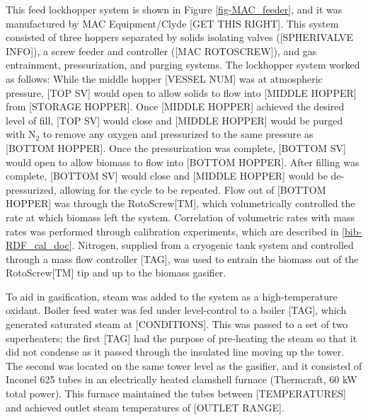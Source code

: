 \documentclass[11pt,twocolumn]{article}
\begin{document}
This feed lockhopper system is shown in Figure \ref{fig-MAC_feeder}, and it was manufactured by MAC Equipment/Clyde [GET THIS RIGHT].  This system consisted of three hoppers separated by solids isolating valves ([SPHERIVALVE INFO]), a screw feeder and controller ([MAC ROTOSCREW]), and gas entrainment, pressurization, and purging systems.  The lockhopper system worked as follows:  While the middle hopper [VESSEL NUM] was at atmospheric pressure, [TOP SV] would open to allow solids to flow into [MIDDLE HOPPER] from [STORAGE HOPPER].  Once [MIDDLE HOPPER] achieved the desired level of fill, [TOP SV] would close and [MIDDLE HOPPER] would be purged with N$_2$ to remove any oxygen and pressurized to the same pressure as [BOTTOM HOPPER].  Once the pressurization was complete, [BOTTOM SV] would open to allow biomass to flow into [BOTTOM HOPPER].  After filling was complete, [BOTTOM SV] would close and [MIDDLE HOPPER] would be de-pressurized, allowing for the cycle to be repeated.  Flow out of [BOTTOM HOPPER] was through the RotoScrew[TM], which volumetrically controlled the rate at which biomass left the system.  Correlation of volumetric rates with mass rates was performed through calibration experiments, which are described in \ref{bib-RDF_cal_doc}.  Nitrogen, supplied from a cryogenic tank system and controlled through a mass flow controller [TAG], was used to entrain the biomass out of the RotoScrew[TM] tip and up to the biomass gasifier.

To aid in gasification, steam was added to the system as a high-temperature oxidant.  Boiler feed water was fed under level-control to a boiler [TAG], which generated saturated steam at [CONDITIONS].  This was passed to a set of two superheaters; the first [TAG] had the purpose of pre-heating the steam so that it did not condense as it passed through the insulated line moving up the tower.  The second was located on the same tower level as the gasifier, and it consisted of Inconel 625 tubes in an electrically heated clamshell furnace (Thermcraft, 60 kW total power).  This furnace maintained the tubes between [TEMPERATURES] and achieved outlet steam temperatures of [OUTLET RANGE].
\end{document}
